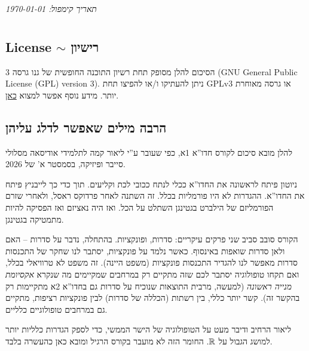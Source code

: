 \documentclass[name=רשימות חשבון דיפרנציאלי ואינטגרלי 1א]{../../../tex/classes/megasumPreamble}
\author{שחר פרץ}
\title{\name}
\date{26 לאוקטובר 2025}
\begin{document}
	
	\renewcommand{\footrule}{\rule{\linewidth-19pt}{0.25pt}\vspace{-5pt}}
	
	\newpage
	
	\hfil \textit{תאריך קימפול: \today}

	\section[מבוא]{}

	\subsection[רישיון]{License $\sim$ רישיון}
	
	הסיכום להלן מסופק תחת רשיון התוכנה החופשית של גנו גרסה 3 (GNU General Public License (GPL) version 3). ניתן להעתיקו ו/או להפיצו תחת GPLv3 או גרסה מאוחרת יותר. מידע נוסף אפשר למצוא \href{https://www.gnu.org/licenses}{כאן}. 
	
	\subsection{הרבה מילים שאפשר לדלג עליהן}
	להלן מובא סיכום לקורס חדו''א 1א, כפי שעובר ע''י ליאור קמה לתלמידי אודיסאה מסלולי סייבר ופיזיקה, בסמסטר א' של 2026. 

	ניוטון פיתח לראשונה את החדו''א ככלי לנתח ככובי לכת וקליעים. תוך כדי כך לייבניץ פיתח את החדו''א. ההגדרות לא היו פורמליות בכלל. זה השתנה לאחר פרדוקס ראסל, ולאחרי שזרם הפורמליזם של הילברט בגטינגן השתלט על הכל. ואז היה נאציזם ואז הפסיקה להיות מתמטיקה בגטינגן. 
	
	הקורס סובב סביב שני פרקים עיקריים: סדרות, ופונקציות. בהתחלה, נדבר על סדרות – האם ולאן סדרות שואפות באינסוף. כאשר נלמד על פונקציות, יסתבר לנו שחקר של התכנסות סדרות מאפשר לנו להגדיר התכנסות פונקציות (משפט היינה). זה משפט לא טרוויאלי בכלל, ואם תקחו טופולוגיה יסתבר לכם שזה מתקיים רק במרחבים שמקיימים מה שנקרא \textit{אקסיומת מנייה ראשונה} (למעשה, מרבית התוצאות שנוכיח על סדרות גם בחדו''א 2א מתקיימות רק בהקשר זה). קשר יותר כללי, בין רשתות (הכללה של סדרות) לבין פונקציות רציפות, מתקיים גם במרחבים טופולוגיים כלליים. 
	
	ליאור הרחיב ודיבר מעט על הטופולוגיה של הישר הממשי, כדי לספק הגדרות כלליות יותר למושג הגבול על $\mathbb{R}$. החומר הזה לא מועבר בקורס הרגיל ומובא כאן כהעשרה בלבד. 
	
\end{document}

